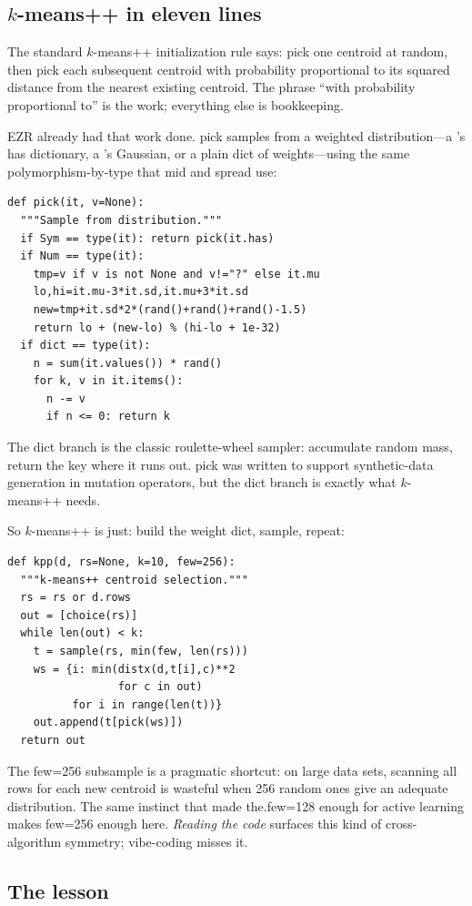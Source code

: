 {\subsection*{$k$-means++ in eleven lines}

The standard $k$-means++ initialization rule says: pick one centroid
at random, then pick each subsequent centroid with probability
proportional to its squared distance from the nearest existing
centroid. The phrase ``with probability proportional to'' is the
work; everything else is bookkeeping.

EZR already had that work done. \textsf{pick} samples from a
weighted distribution---a 's \textsf{has} dictionary, a
's Gaussian, or a plain dict of weights---using the same
polymorphism-by-type that \textsf{mid} and \textsf{spread} use:
\begin{verbatim}
def pick(it, v=None):
  """Sample from distribution."""
  if Sym == type(it): return pick(it.has)
  if Num == type(it):
    tmp=v if v is not None and v!="?" else it.mu
    lo,hi=it.mu-3*it.sd,it.mu+3*it.sd
    new=tmp+it.sd*2*(rand()+rand()+rand()-1.5)
    return lo + (new-lo) % (hi-lo + 1e-32)
  if dict == type(it):
    n = sum(it.values()) * rand()
    for k, v in it.items():
      n -= v
      if n <= 0: return k
\end{verbatim}
The dict branch is the classic roulette-wheel sampler: accumulate
random mass, return the key where it runs out. \textsf{pick} was
written to support synthetic-data generation in mutation operators,
but the dict branch is exactly what $k$-means++ needs.

So $k$-means++ is just: build the weight dict, sample, repeat:
\begin{verbatim}
def kpp(d, rs=None, k=10, few=256):
  """k-means++ centroid selection."""
  rs = rs or d.rows
  out = [choice(rs)]
  while len(out) < k:
    t = sample(rs, min(few, len(rs)))
    ws = {i: min(distx(d,t[i],c)**2
                 for c in out)
          for i in range(len(t))}
    out.append(t[pick(ws)])
  return out
\end{verbatim}
The \textsf{few=256} subsample is a pragmatic shortcut: on large
data sets, scanning all rows for each new centroid is wasteful when
256 random ones give an adequate distribution. The same instinct
that made \textsf{the.few}=128 enough for active learning makes
\textsf{few}=256 enough here. {\em Reading the code} surfaces this
kind of cross-algorithm symmetry; vibe-coding misses it.

\subsection*{The lesson}

}
